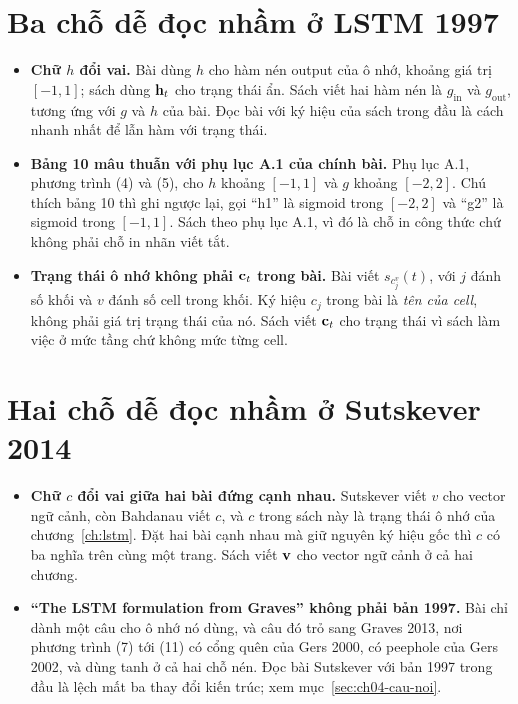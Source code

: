 \section{Ba chỗ dễ đọc nhầm ở LSTM 1997}
\label{sec:app-a-lstm}

\begin{itemize}
  \item \textbf{Chữ \(h\) đổi vai.} Bài dùng \(h\) cho hàm nén output của ô
    nhớ, khoảng giá trị \([-1,1]\); sách dùng \(\mathbf{h}_t\) cho trạng thái ẩn.
    Sách viết hai hàm nén là \(g_{\mathrm{in}}\) và \(g_{\mathrm{out}}\), tương
    ứng với \(g\) và \(h\) của bài. Đọc bài với ký hiệu của sách trong đầu là
    cách nhanh nhất để lẫn hàm với trạng thái.
  \item \textbf{Bảng 10 mâu thuẫn với phụ lục A.1 của chính bài.} Phụ lục A.1,
    phương trình (4) và (5), cho \(h\) khoảng \([-1,1]\) và \(g\) khoảng
    \([-2,2]\). Chú thích bảng 10 thì ghi ngược lại, gọi \enquote{h1} là
    sigmoid trong \([-2,2]\) và \enquote{g2} là sigmoid trong \([-1,1]\). Sách
    theo phụ lục A.1, vì đó là chỗ in công thức chứ không phải chỗ in nhãn viết
    tắt.
  \item \textbf{Trạng thái ô nhớ không phải \(\mathbf{c}_t\) trong bài.} Bài viết
    \(s_{c_j^v}(t)\), với \(j\) đánh số khối và \(v\) đánh số cell trong khối.
    Ký hiệu \(c_j\) trong bài là \emph{tên của cell}, không phải giá trị trạng
    thái của nó. Sách viết \(\mathbf{c}_t\) cho trạng thái vì sách làm việc ở mức
    tầng chứ không mức từng cell.
\end{itemize}

\section{Hai chỗ dễ đọc nhầm ở Sutskever 2014}
\label{sec:app-a-sutskever}

\begin{itemize}
  \item \textbf{Chữ \(c\) đổi vai giữa hai bài đứng cạnh nhau.} Sutskever viết
    \(v\) cho vector ngữ cảnh, còn Bahdanau viết \(c\), và \(c\) trong sách này
    là trạng thái ô nhớ của chương~\ref{ch:lstm}. Đặt hai bài cạnh nhau mà giữ
    nguyên ký hiệu gốc thì \(c\) có ba nghĩa trên cùng một trang. Sách viết
    \(\mathbf{v}\) cho vector ngữ cảnh ở cả hai chương.
  \item \textbf{\enquote{The LSTM formulation from Graves} không phải bản 1997.}
    Bài chỉ dành một câu cho ô nhớ nó dùng, và câu đó trỏ sang Graves 2013, nơi
    phương trình (7) tới (11) có cổng quên của Gers 2000, có peephole của Gers
    2002, và dùng tanh ở cả hai chỗ nén. Đọc bài Sutskever với bản 1997 trong
    đầu là lệch mất ba thay đổi kiến trúc; xem mục~\ref{sec:ch04-cau-noi}.
\end{itemize}
